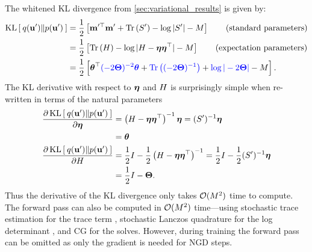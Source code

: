 The whitened KL divergence from \cref{sec:variational_results} is given by:
%
\begin{align}
  \kl{ q(\bu') }{ p(\bu') }
  &= \frac{1}{2} \left[ \bmm^{\prime \top} \bmm' + \tr{ \bS' } - \log \vert \bS' \vert - M \right]
  \tag{standard parameters} \\
  &= \frac{1}{2} \left[ \tr{ \bEta } - \log \vert \bEta - \boeta \boeta^\top \vert - M \right]
  \tag{expectation parameters} \\
  &= \frac{1}{2} \left[ \btheta^\top {\color{blue} (-2 \bTheta)^{-2} \btheta} + {\color{blue} \tr{(-2 \bTheta)^{-1}}} + {\color{blue} \log \vert -2 \bTheta \vert} - M \right]
  \label{eqn:kl_natural}.
\end{align}
%
The KL derivative with respect to $\boldsymbol{\eta}$ and $H$ is surprisingly simple when re-written in terms of the natural parameters
%
\begin{align}
  \frac{\partial \operatorname*{KL} \left[ \:  q(\mathbf{u}')  \Vert  p(\mathbf{u}')  \: \right]}{ \partial \boldsymbol{\eta} }
  &= \left( H - \boldsymbol{\eta} \boldsymbol{\eta}^\top \right)^{-1} \boldsymbol{\eta}
  = (S')^{-1} \boldsymbol{\eta}
  \nonumber \\
  &= \boldsymbol{\theta}
  \label{eqn:kl_mean_deriv}
  \\
  \frac{\partial \operatorname*{KL} \left[ \:  q(\mathbf{u}')  \Vert  p(\mathbf{u}')  \: \right]}{ \partial H }
  &= \frac 1 2 I - \frac 1 2 \left( H - \boldsymbol{\eta} \boldsymbol{\eta}^\top \right)^{-1}
  = \frac 1 2 I - \frac 1 2 (S')^{-1} \boldsymbol{\eta}
  \nonumber \\
  &= \frac 1 2 I - \boldsymbol{\Theta}.
  \label{eqn:kl_covar_deriv}
\end{align}
%
Thus the derivative of the KL divergence only takes $\bigo{M^2}$ time to compute.
The forward pass can also be computed in $\bigo{M^2}$ time---using stochastic trace estimation for the trace term \citep{cutajar2016preconditioning,gardner2018gpytorch}, stochastic Lanczos quadrature for the log determinant \citep{ubaru2017fast,dong2017scalable}, and CG for the solves.
However, during training the forward pass can be omitted as only the gradient is needed for NGD steps.
